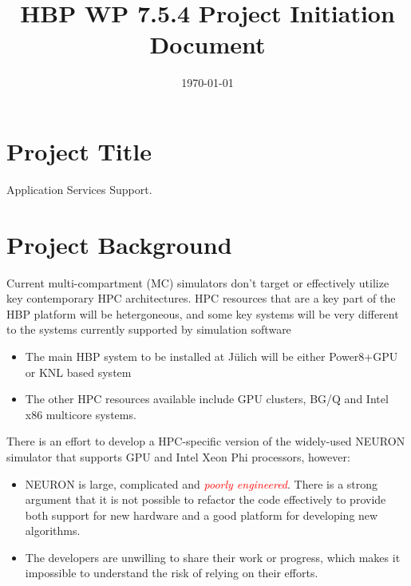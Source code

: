 \documentclass[11pt,a4paper]{article}
\newcommand{\hilight}[1]{\textit{\textcolor{Red}{#1}}}
\newcommand{\julich}[0]{J\"ulich\xspace}
\begin{document}
\title{HBP WP 7.5.4 Project Initiation Document}
\date{\today}
\maketitle

\section{Project Title}
Application Services Support.

\section{Project Background}

Current multi-compartment (MC) simulators don't target or effectively utilize key contemporary HPC architectures.
HPC resources that are a key part of the HBP platform will be hetergoneous, and some key systems will be very different to the systems currently supported by simulation software
\begin{itemize}
    \item The main HBP system to be installed at \julich will be either Power8+GPU or KNL based system
    \item The other HPC resources available include GPU clusters, BG/Q and Intel x86 multicore systems.
\end{itemize}

There is an effort to develop a HPC-specific version of the widely-used NEURON simulator that supports GPU and Intel Xeon Phi processors, however:
\begin{itemize}
    \item NEURON is large, complicated and \hilight{poorly engineered}. There is a strong argument that it is not possible to refactor the code effectively to provide both support for new hardware and a good platform for developing new algorithms.
    \item The developers are unwilling to share their work or progress, which makes it impossible to understand the risk of relying on their efforts.
\end{itemize}


\end{document}
